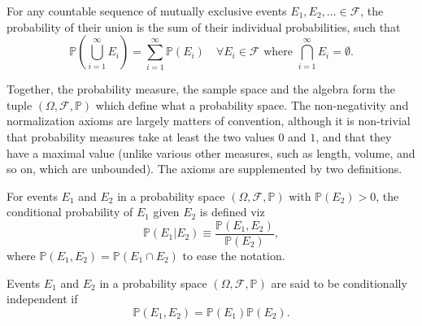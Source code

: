 \begin{axiom}[Additivity]
	\label{ax:add}
	For any countable sequence of mutually exclusive events $\mathit{E}_1, \mathit{E}_2, \ldots\in \mathcal{F}$, the probability of their union is the sum of their individual probabilities, such that
	\begin{equation}
		\mathbb{P}\left(\bigcup_{i=1}^{\infty} \mathit{E}_i\right) = \sum_{i=1}^{\infty} \mathbb{P}(\mathit{E}_i) \quad \forall \mathit{E}_i \in \mathcal{F} \text{ where } \bigcap_{i=1}^{\infty} \mathit{E}_i = \emptyset.
	\end{equation}
\end{axiom}
Together, the probability measure, the sample space and the algebra form the tuple $(\Omega, \mathcal{F}, \mathbb{P})$ which define what a probability space. The non-negativity and normalization axioms are largely matters of convention, although it is non-trivial that probability measures take at least the two values $0$ and $1$, and that they have a maximal value (unlike various other measures, such as length, volume, and so on, which are unbounded). The axioms are supplemented by two definitions.

\begin{definition}
	\label{def:conditional_probability}
	For events $E_1$ and $E_2$ in a probability space $(\Omega, \mathcal{F}, \mathbb{P})$ with $\mathbb{P}(E_2) > 0$, the conditional probability of $E_1$ given $E_2$ is defined viz
	\begin{equation}
		\mathbb{P}(E_1|E_2) \equiv \frac{\mathbb{P}(E_1, E_2)}{\mathbb{P}(E_2)},
		\label{eq:cond}
	\end{equation}
	where $\mathbb{P}(E_1,E_2)= \mathbb{P}(E_1\cap E_2)$ to ease the notation.
\end{definition}
\begin{definition}[Independence]
	\label{def:independence}
	Events $E_1$ and $E_2$  in a probability space $(\Omega, \mathcal{F}, \mathbb{P})$ are said to be conditionally independent if
	\begin{equation}
		\mathbb{P}(E_1,E_2) = \mathbb{P}(E_1) \mathbb{P}(E_2).
		\label{eq:ind}
	\end{equation}
\end{definition}


